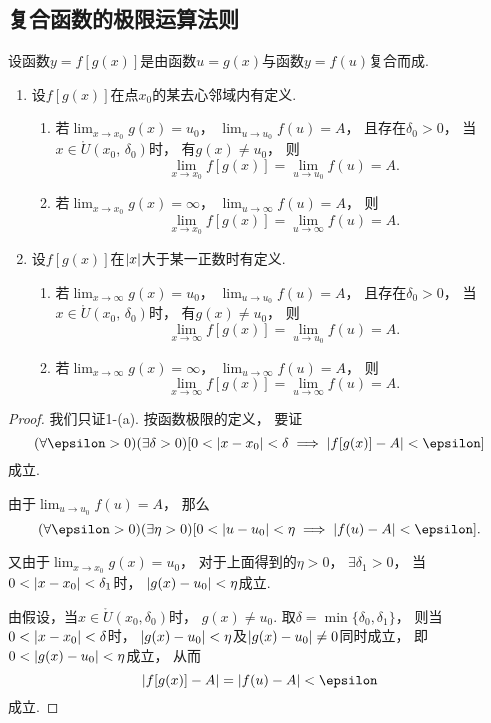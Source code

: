 \subsection{复合函数的极限运算法则}
\begin{theorem}
设函数\(y=f[g(x)]\)是由函数\(u=g(x)\)与函数\(y=f(u)\)复合而成.
\begin{enumerate}
	\item 设\(f[g(x)]\)在点\(x_0\)的某去心邻域内有定义.
	\begin{enumerate}[label={\rm(\roman*)}]
		\item 若\(\lim_{x \to x_0} g(x) = u_0\)，
		\(\lim_{u \to u_0} f(u) = A\)，
		且存在\(\delta_0 > 0\)，
		当\(x \in \mathring{U}(x_0,\,\delta_0)\)时，
		有\(g(x) \neq u_0\)，
		则\[
			\lim_{x \to x_0} f[g(x)]
			= \lim_{u \to u_0} f(u) = A.
		\]
		\item 若\(\lim_{x \to x_0}g(x) = \infty\)，
		\(\lim_{u \to \infty}f(u) = A\)，
		则\[
			\lim_{x \to x_0} f[g(x)]
			= \lim_{u \to \infty} f(u) = A.
		\]
	\end{enumerate}

	\item 设\(f[g(x)]\)在\(\abs{x}\)大于某一正数时有定义.
	\begin{enumerate}[label={\rm(\roman*)}]
	\item 若\(\lim_{x \to \infty} g(x) = u_0\)，
	\(\lim_{u \to u_0} f(u) = A\)，
	且存在\(\delta_0 > 0\)，
	当\(x \in \mathring{U}(x_0,\,\delta_0)\)时，
	有\(g(x) \neq u_0\)，
	则\[
		\lim_{x \to \infty} f[g(x)]
		= \lim_{u \to u_0} f(u) = A.
	\]

	\item 若\(\lim_{x \to \infty}g(x) = \infty\)，
	\(\lim_{u \to \infty}f(u) = A\)，
	则\[
		\lim_{x \to \infty} f[g(x)]
		= \lim_{u \to \infty} f(u) = A.
	\]
	\end{enumerate}
\end{enumerate}
\begin{proof}
我们只证1-(a).
按函数极限的定义，
要证\[
	(\forall\epsilon>0)
	(\exists\delta>0)
	[
		0 < \abs{x - x_0} < \delta
		\implies
		\abs{ f[g(x)] - A } < \epsilon
	]
\]成立.

由于\(\lim_{u \to u_0} f(u) = A\)，
那么\[
	(\forall\epsilon>0)
	(\exists\eta>0)
	[
		0 < \abs{u - u_0} < \eta
		\implies
		\abs{ f(u) - A } < \epsilon
	].
\]

又由于\(\lim_{x \to x_0} g(x) = u_0\)，
对于上面得到的\(\eta > 0\)，
\(\exists \delta_1 > 0\)，
当\(0 < \abs{x - x_0} < \delta_1\)时，
\(\abs{ g(x) - u_0 } < \eta\)成立.

由假设，当\(x \in \mathring{U}(x_0,\delta_0)\)时，
\(g(x) \neq u_0\).
取\(\delta = \min\{\delta_0,\delta_1\}\)，
则当\(0 < \abs{x - x_0} < \delta\)时，
\(\abs{ g(x) - u_0 } < \eta\)及\(\abs{ g(x) - u_0 } \neq 0\)同时成立，
即\(0 < \abs{ g(x) - u_0 } < \eta\)成立，
从而\[
	\abs{ f[g(x)] - A } = \abs{ f(u) - A } < \epsilon
\]成立.
\end{proof}
\end{theorem}
